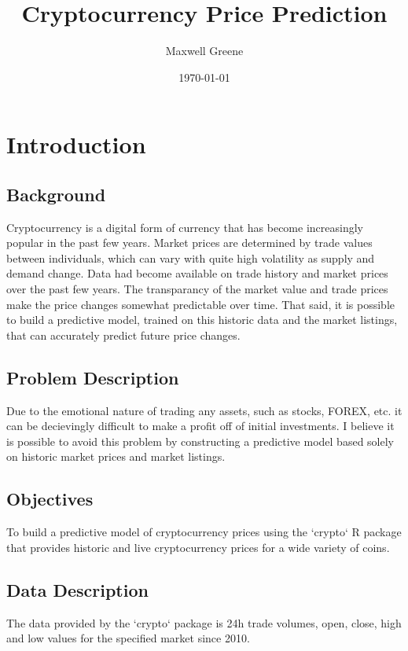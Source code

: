 \documentclass{article}\usepackage[]{graphicx}\usepackage[]{color}
\title{Cryptocurrency Price Prediction}
\author{Maxwell Greene}
\date{\today}
\begin{document}
\maketitle

\section{Introduction}
\subsection{Background}
Cryptocurrency is a digital form of currency that has become increasingly popular in the past few years. Market prices are determined by trade values between individuals, which can vary with quite high volatility as supply and demand change. Data had become available on trade history and market prices over the past few years. The transparancy of the market value and trade prices make the price changes somewhat predictable over time. That said, it is possible to build a predictive model, trained on this historic data and the market listings, that can accurately predict future price changes.

\subsection{Problem Description}
Due to the emotional nature of trading any assets, such as stocks, FOREX, etc. it can be decievingly difficult to make a profit off of initial investments. I believe it is possible to avoid this problem by constructing a predictive model based solely on historic market prices and market listings.

\subsection{Objectives}
To build a predictive model of cryptocurrency prices using the `crypto` R package that provides historic and live cryptocurrency prices for a wide variety of coins.

\subsection{Data Description}
The data provided by the `crypto` package is 24h trade volumes, open, close, high and low values for the specified market since 2010.
\end{document}

